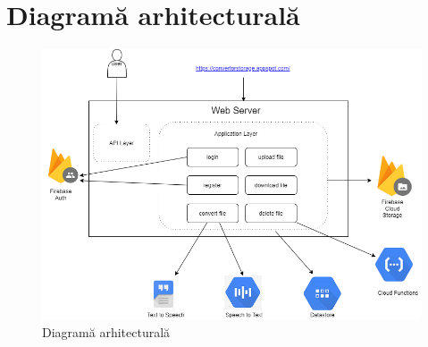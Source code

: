 \documentclass[12pt]{article}
\begin{document}
\section{Diagramă arhitecturală}
\begin{figure}[h!]
	\centering
    	\includegraphics[width=1.0\textwidth]{architectural.png}
        \caption{Diagramă arhitecturală}
\end{figure}
\end{document}

